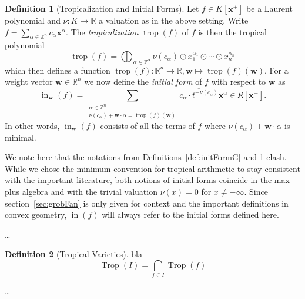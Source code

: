 \documentclass[
  paper=a4,
  titlepage,
  bibliography=totoc,
  listof=totoc,
  pagesize=pdftex
]{scrartcl}
\numberwithin{figure}{section}
\numberwithin{equation}{section}
\numberwithin{table}{section}
\newcommand*\setZ{\mathds{Z}}
\newcommand*\setR{\mathds{R}}
\let\vec\mathbf
\DeclareMathOperator{\Trop}{Trop}
\DeclareMathOperator{\trop}{trop}
\DeclareMathOperator{\initial}{in}
\theoremstyle{definition}
\newtheorem{definition}{Definition}
\numberwithin{definition}{section}
\begin{document}
\begin{definition}[Tropicalization and Initial Forms]
  Let $f \in K[\vec x^\pm]$ be a Laurent polynomial and $\nu : K \to \setR$ a valuation as
  in the above setting. Write $f = \sum_{\alpha \in \setZ^n} c_\alpha \vec x^\alpha$. The
  \emph{tropicalization} $\trop(f)$ of $f$ is then the tropical polynomial
  \[
    \trop(f) = \bigoplus_{\alpha\in\setZ^\alpha} \nu(c_\alpha)
    \odot x_1^{\alpha_1}\odot\cdots \odot x_n^{\alpha_n}
  \]
  which then defines a function $\trop(f) : \setR^n \to \setR, \vec w \mapsto
  \trop(f)(\vec w)$. For a weight vector $\vec w \in \setR^n$ we now define the
  \emph{initial form} of $f$ with respect to $\vec w$ as
  \[
    \initial_{\vec w}(f) =
    \sum_{ \substack{
        \alpha \in \setZ^n \\
        \nu(c_\alpha) + \vec w\cdot \alpha = \trop(f)(\vec w)
    }} \overline {c_\alpha \cdot t^{-\nu(c_\alpha)} } \vec x^\alpha
    \in \mathfrak K[\vec x^\pm].
  \]
  In other words, $\initial_{\vec w}(f)$ consists of all the terms of $f$ where
  $\nu(c_\alpha)+\vec w\cdot \alpha$ is minimal.
  \label{def:initialId}
\end{definition}

We note here that the notations from Definitions~\ref{def:initFormG} and
\ref{def:initialId} clash. While we chose the minimum-convention for tropical arithmetic
to stay consistent with the important literature, both notions of initial forms coincide
in the max-plus algebra and with the trivial valuation $\nu(x) = 0$ for $x\neq-\infty$.
Since section~\ref{sec:grobFan} is only given for context and the important definitions in
convex geometry, $\initial(f)$ will always refer to the initial forms defined here.

\dots %

\begin{definition}[Tropical Varieties]
  bla %
  \[
    \Trop(I) = \bigcap_{f \in I} \Trop(f)
  \]
  \label{def:tropicalVariety}
\end{definition}

\dots %
\end{document}
